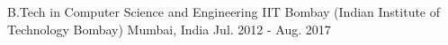 

\begin{cventries}

  \cventry
    {B.Tech in Computer Science and Engineering} %
    {IIT Bombay (Indian Institute of Technology Bombay)} %
    {Mumbai, India} %
    {Jul. 2012 -  Aug. 2017} %
    {}

\end{cventries}